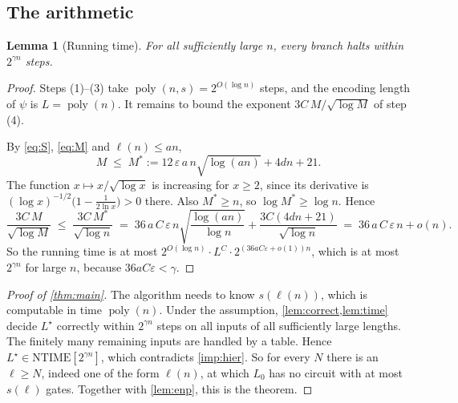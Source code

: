 \documentclass[10pt]{amsart}
\theoremstyle{plain}
\newtheorem{lemma}[theorem]{Lemma}
\theoremstyle{definition}
\theoremstyle{remark}
\numberwithin{equation}{section}
\newcommand{\poly}{\operatorname{poly}}
\newcommand{\NTIME}{\mathrm{NTIME}}
\begin{document}
\subsection{The arithmetic}
\begin{lemma}[Running time]\label{lem:time}
For all sufficiently large $n$, every branch halts within $2^{\gamma n}$ steps.
\end{lemma}

\begin{proof}
Steps (1)--(3) take $\poly(n,s)=2^{O(\log n)}$ steps, and the encoding length of $\psi$ is
$L=\poly(n)$. It remains to bound the exponent $3C\,M/\sqrt{\log M}$ of step (4).

By \eqref{eq:S}, \eqref{eq:M} and $\ell(n)\le an$,
\[
  M\;\le\;M^\ast:=12\,\varepsilon\,a\,n\sqrt{\log(an)}+4dn+21 .
\]
The function $x\mapsto x/\sqrt{\log x}$ is increasing for $x\ge2$, since its derivative is
$(\log x)^{-1/2}\bigl(1-\tfrac{1}{2\ln x}\bigr)>0$ there. Also $M^\ast\ge n$, so
$\log M^\ast\ge\log n$. Hence
\begin{equation}\label{eq:exp}
  \frac{3C\,M}{\sqrt{\log M}}\;\le\;\frac{3C\,M^\ast}{\sqrt{\log n}}
  \;=\;36\,a\,C\,\varepsilon\,n\sqrt{\frac{\log(an)}{\log n}}+\frac{3C(4dn+21)}{\sqrt{\log n}}
  \;=\;36\,a\,C\,\varepsilon\,n+o(n).
\end{equation}
So the running time is at most $2^{O(\log n)}\cdot L^C\cdot2^{(36aC\varepsilon+o(1))n}$, which is
at most $2^{\gamma n}$ for large $n$, because $36aC\varepsilon<\gamma$.
\end{proof}

\begin{proof}[Proof of \cref{thm:main}]
The algorithm needs to know $s(\ell(n))$, which is computable in time $\poly(n)$. Under the
assumption, \cref{lem:correct,lem:time} decide $L^\star$ correctly within $2^{\gamma n}$ steps on all
inputs of all sufficiently large lengths. The finitely many remaining inputs are handled by a
table. Hence $L^\star\in\NTIME[2^{\gamma n}]$, which contradicts \cref{imp:hier}. So for every $N$
there is an $\ell\ge N$, indeed one of the form $\ell(n)$, at which $L_0$ has no circuit with at
most $s(\ell)$ gates. Together with \cref{lem:enp}, this is the theorem.
\end{proof}
\end{document}
